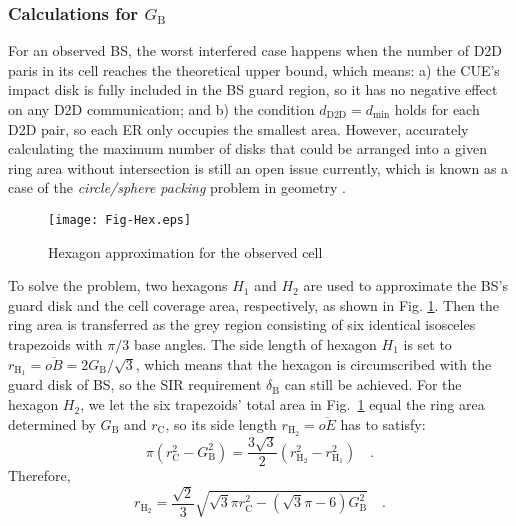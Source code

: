 \documentclass[journal, 10pt]{IEEEtran}
\begin{document}
\subsubsection{Calculations for $G_\mathrm{B}$}
For an observed BS, the worst interfered case happens when the number
of D2D paris in its cell reaches the theoretical upper bound, which
means: a) the CUE's impact disk is fully included in the BS guard
region, so it has no negative effect on any D2D communication; and b)
the condition $d_\mathrm{D2D} = d_{\min}$ holds for each D2D pair, so
each ER only occupies the smallest area. 
However, accurately calculating the maximum number of disks that
could be arranged into a given ring area without intersection is still
an open issue currently, which is known as a case of the 
\emph{circle/sphere
packing} problem in geometry \cite{Stephenson:03circlepacking}. 
\begin{figure}[!h]
\centering
\texttt{[image: Fig-Hex.eps]} \caption{Hexagon approximation for the observed cell} \label{fig:hex-appox}
\end{figure}

To solve the problem, two hexagons $H_1$ and $H_2$ are used to
approximate the BS's guard disk and the cell coverage area,
respectively, as shown in Fig. \ref{fig:hex-appox}. Then the ring area
is transferred as the grey region consisting of six identical
isosceles trapezoids with $\pi/3$ base angles. The side length of
hexagon $H_1$ is set to $r_{\mathrm{H}_1} = \overline{oB} =
2G_\mathrm{B}/\sqrt{3}$, which means that the hexagon is circumscribed
with the guard disk of BS, so the SIR requirement $\delta_\mathrm{B}$
can still be achieved. For the hexagon $H_2$, we let the six
trapezoids' total area in Fig.~\ref{fig:hex-appox} equal the ring area
determined by $G_\mathrm{B}$ and $r_\mathrm{C}$, so its side length
$r_{\mathrm{H}_2} = \overline{oE}$ has to satisfy: 
\begin{equation}
\pi \left(r_\mathrm{C}^2 - G_\mathrm{B}^2\right) 
= \frac{3\sqrt{3}}{2}\left(r_{\mathrm{H_2}}^2 - r_{\mathrm{H_1}}^2\right)\quad.
\end{equation}
Therefore, 
\begin{equation}
r_{\mathrm{H}_2} = \frac{\sqrt{2}}{3} \sqrt{\sqrt{3}\pi r_\mathrm{C}^2  - 
\left(\sqrt{3} \pi - 6\right)G_\mathrm{B}^2 } 
\quad.
\end{equation}
\end{document}
